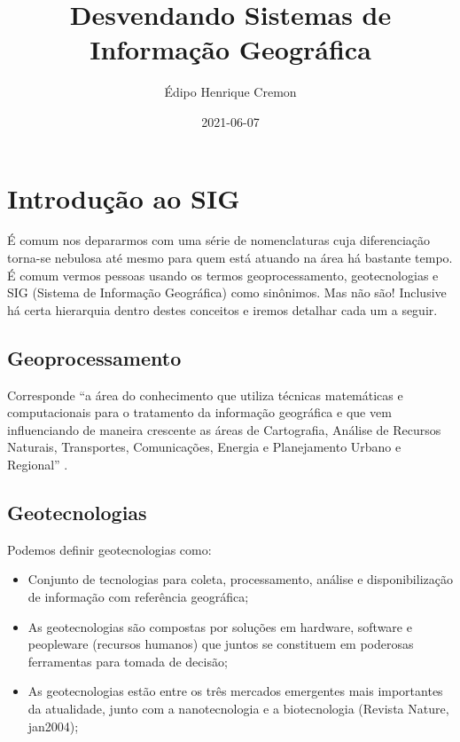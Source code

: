 \documentclass[
]{book}
\title{Desvendando Sistemas de Informação Geográfica}
\author{Édipo Henrique Cremon}
\date{2021-06-07}
\begin{document}
\maketitle

{
\setcounter{tocdepth}{1}
\tableofcontents
}
\hypertarget{introduuxe7uxe3o-ao-sig}{%
\chapter{Introdução ao SIG}\label{introduuxe7uxe3o-ao-sig}}

É comum nos depararmos com uma série de nomenclaturas cuja diferenciação torna-se nebulosa até mesmo para quem está atuando na área há bastante tempo. É comum vermos pessoas usando os termos geoprocessamento, geotecnologias e SIG (Sistema de Informação Geográfica) como sinônimos. Mas não são! Inclusive há certa hierarquia dentro destes conceitos e iremos detalhar cada um a seguir.

\hypertarget{geoprocessamento}{%
\section{Geoprocessamento}\label{geoprocessamento}}

Corresponde ``a área do conhecimento que utiliza técnicas matemáticas e computacionais para o tratamento da informação geográfica e que vem influenciando de maneira crescente as áreas de Cartografia, Análise de Recursos Naturais, Transportes, Comunicações, Energia e Planejamento Urbano e Regional'' \citep{CamaraDavis2001}.

\hypertarget{geotecnologias}{%
\section{Geotecnologias}\label{geotecnologias}}

Podemos definir geotecnologias como:

\begin{itemize}
\item
  Conjunto de tecnologias para coleta, processamento, análise e disponibilização de informação com referência geográfica;
\item
  As geotecnologias são compostas por soluções em hardware, software e peopleware (recursos humanos) que juntos se constituem em poderosas ferramentas para tomada de decisão;
\item
  As geotecnologias estão entre os três mercados emergentes mais importantes da atualidade, junto com a nanotecnologia e a biotecnologia (Revista Nature, jan2004);
\end{itemize}
\end{document}

